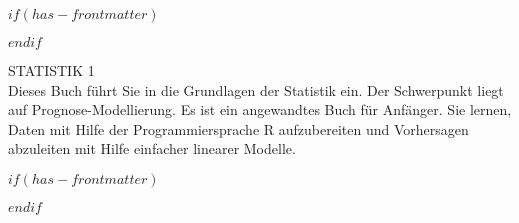 
$if(has-frontmatter)$
  \begin{frontmatter}
$endif$



\begin{titlepage}
    \centering
    \vspace*{3cm}
    {\Huge STATISTIK 1\\}
    \vspace*{2cm}
    \noindent %
Dieses Buch führt Sie in die Grundlagen der Statistik ein.
Der Schwerpunkt liegt auf Prognose-Modellierung.
Es ist ein angewandtes Buch für Anfänger.
Sie lernen, Daten mit Hilfe der Programmiersprache R aufzubereiten 
und Vorhersagen abzuleiten mit Hilfe einfacher linearer Modelle.    

    \vfill
\end{titlepage}


\newpage
\null
\thispagestyle{empty} %
\newpage



\setcounter{page}{1}
$if(has-frontmatter)$
\end{frontmatter}
$endif$


